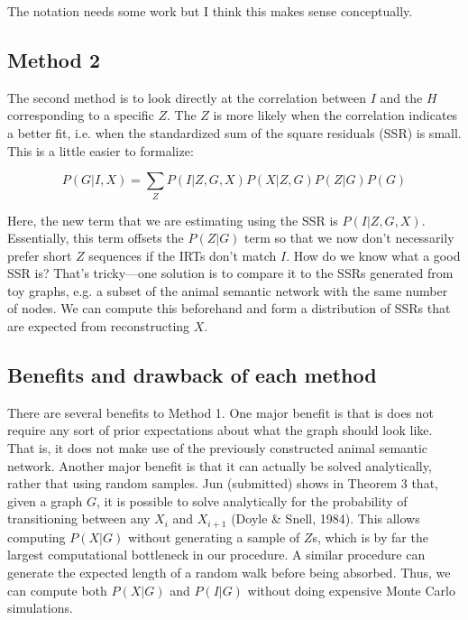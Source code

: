 \documentclass{article}
\begin{document}
The notation needs some work but I think this makes sense conceptually.


\subsection{Method 2}
\label{sec:method2}

The second method is to look directly at the correlation between $I$ and the
$H$ corresponding to a specific $Z$. The $Z$ is more likely when
the correlation indicates a better fit, i.e. when the standardized sum of the
square residuals (SSR) is small. This is a little easier to formalize:

\begin{equation}
    P(G|I,X) = \sum_{Z} P(I|Z,G,X) P(X|Z,G) P(Z|G) P(G)     
\end{equation}

Here, the new term that we are estimating using the SSR is $P(I|Z,G,X)$.
Essentially, this term offsets the $P(Z|G)$ term so that we now don't
necessarily prefer short $Z$ sequences if the IRTs don't match $I$. How do we
know what a good SSR is? That's tricky---one solution is to compare it to the
SSRs generated from toy graphs, e.g. a subset of the animal semantic network
with the same number of nodes. We can compute this beforehand and form a
distribution of SSRs that are expected from reconstructing $X$.

\subsection{Benefits and drawback of each method}

There are several benefits to Method 1. One major benefit is that is does not
require any sort of prior expectations about what the graph should look like.
That is, it does not make use of the previously constructed animal semantic
network. Another major benefit is that it can actually be solved analytically,
rather that using random samples. Jun (submitted) shows in Theorem 3 that,
given a graph $G$, it is possible to solve analytically for the probability of
transitioning between any $X_i$ and $X_{i+1}$ (Doyle \& Snell, 1984). This
allows computing $P(X|G)$ without generating a sample of $Z$s, which is by far
the largest computational bottleneck in our procedure. A similar procedure can
generate the expected length of a random walk before being absorbed. Thus, we
can compute both $P(X|G)$ and $P(I|G)$ without doing expensive Monte Carlo
simulations.
\end{document}

